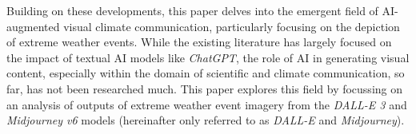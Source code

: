 Building on these developments, this paper delves into the emergent field of AI-augmented visual climate communication, particularly focusing on the depiction of extreme weather events. While the existing literature has largely focused on the impact of textual AI models like \textit{ChatGPT}, the role of AI in generating visual content, especially within the domain of scientific and climate communication, so far, has not been researched much. This paper explores this field by focussing on an analysis of outputs of extreme weather event imagery  from the \textit{DALL-E 3} and \textit{Midjourney v6} models (hereinafter only referred to as \textit{DALL-E} and \textit{Midjourney}).